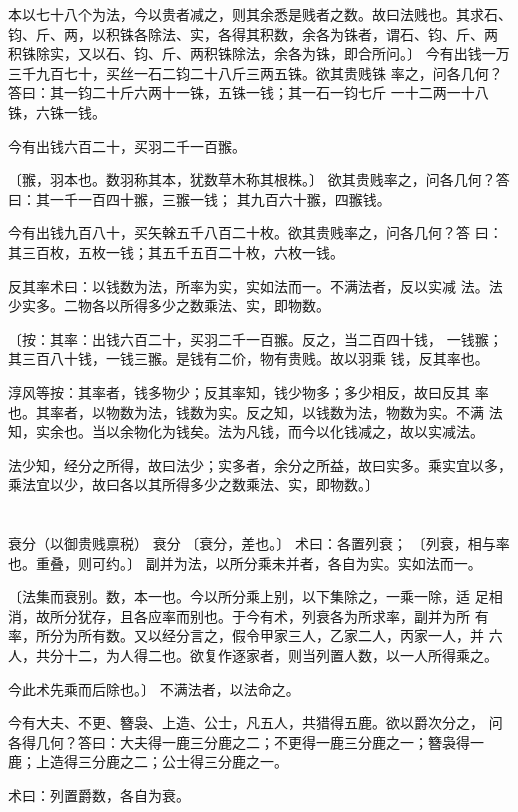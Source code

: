 \documentclass[a4paper,12pt,UTF8,twoside]{ctexbook}
\begin{document}
本以七十八个为法，今以贵者减之，则其余悉是贱者之数。故曰法贱也。其求石、 钧、斤、两，以积铢各除法、实，各得其积数，余各为铢者，谓石、钧、斤、两 积铢除实，又以石、钧、斤、两积铢除法，余各为铢，即合所问。〕 今有出钱一万三千九百七十，买丝一石二钧二十八斤三两五铢。欲其贵贱铢 率之，问各几何？答曰：其一钧二十斤六两十一铢，五铢一钱；其一石一钧七斤 一十二两一十八铢，六铢一钱。

今有出钱六百二十，买羽二千一百翭。

〔翭，羽本也。数羽称其本，犹数草木称其根株。〕 欲其贵贱率之，问各几何？答曰：其一千一百四十翭，三翭一钱； 其九百六十翭，四翭钱。

今有出钱九百八十，买矢榦五千八百二十枚。欲其贵贱率之，问各几何？答 曰：其三百枚，五枚一钱；其五千五百二十枚，六枚一钱。

反其率术曰：以钱数为法，所率为实，实如法而一。不满法者，反以实减 法。法少实多。二物各以所得多少之数乘法、实，即物数。

〔按：其率：出钱六百二十，买羽二千一百翭。反之，当二百四十钱， 一钱翭；其三百八十钱，一钱三翭。是钱有二价，物有贵贱。故以羽乘 钱，反其率也。

淳风等按：其率者，钱多物少；反其率知，钱少物多；多少相反，故曰反其 率也。其率者，以物数为法，钱数为实。反之知，以钱数为法，物数为实。不满 法知，实余也。当以余物化为钱矣。法为凡钱，而今以化钱减之，故以实减法。

法少知，经分之所得，故曰法少；实多者，余分之所益，故曰实多。乘实宜以多， 乘法宜以少，故曰各以其所得多少之数乘法、实，即物数。〕

\chapter{}
衰分（以御贵贱禀税） 衰分 〔衰分，差也。〕 术曰：各置列衰； 〔列衰，相与率也。重叠，则可约。〕 副并为法，以所分乘未并者，各自为实。实如法而一。

〔法集而衰别。数，本一也。今以所分乘上别，以下集除之，一乘一除，适 足相消，故所分犹存，且各应率而别也。于今有术，列衰各为所求率，副并为所 有率，所分为所有数。又以经分言之，假令甲家三人，乙家二人，丙家一人，并 六人，共分十二，为人得二也。欲复作逐家者，则当列置人数，以一人所得乘之。

今此术先乘而后除也。〕 不满法者，以法命之。

今有大夫、不更、簪袅、上造、公士，凡五人，共猎得五鹿。欲以爵次分之， 问各得几何？答曰：大夫得一鹿三分鹿之二；不更得一鹿三分鹿之一；簪袅得一 鹿；上造得三分鹿之二；公士得三分鹿之一。

术曰：列置爵数，各自为衰。
\end{document}

